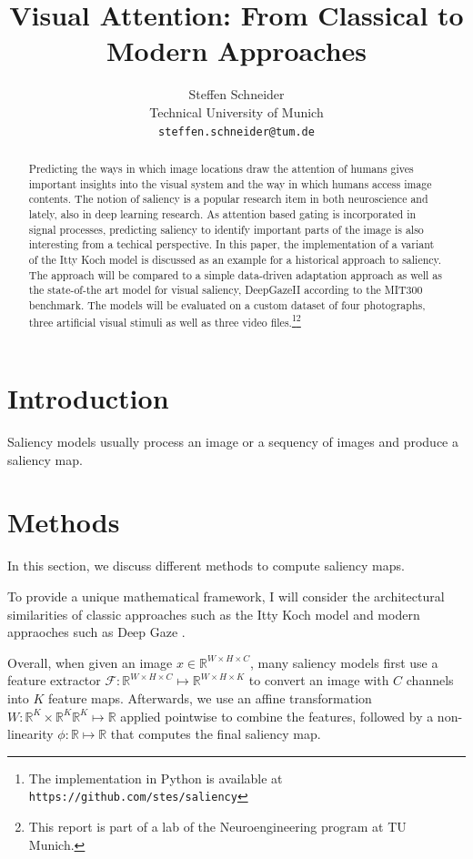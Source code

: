 \documentclass[a4paper,twocolumn,10pt]{article}
\title{Visual Attention: From Classical to Modern Approaches}
\author{Steffen Schneider\\
Technical University of Munich\\
\texttt{steffen.schneider@tum.de}\\
}
\date{}
\newcommand{\R}{\mathds{R}}
\newcommand{\F}{\mathcal{F}}
\begin{document}
\maketitle


\begin{abstract}
  Predicting the ways in which image locations draw the attention of humans gives important insights into the visual system and the way in which humans access image contents.
  The notion of saliency is a popular research item in both neuroscience and lately, also in deep learning research.
  As attention based gating is incorporated in signal processes, predicting saliency to identify important parts of the image is also interesting from a techical perspective.
  In this paper, the implementation of a variant of the Itty Koch model \cite{Itti2000} is discussed as an example for a historical approach to saliency.
  The approach will be compared to a simple data-driven adaptation approach as well as the state-of-the art model for visual saliency, DeepGazeII \cite{Kummerer2017b} according to the MIT300 benchmark.
  The models will be evaluated on a custom dataset of four photographs, three artificial visual stimuli as well as three video files.\footnote{The implementation in Python is available at \texttt{https://github.com/stes/saliency}}\footnote{This report is part of a lab of the Neuroengineering program at TU Munich.}
\end{abstract}

\section{Introduction}

Saliency models usually process an image or a sequency of images and produce a saliency map.

\section{Methods}

In this section, we discuss different methods to compute saliency maps.

To provide a unique mathematical framework, I will consider the architectural similarities of classic approaches such as the Itty Koch model \cite{Itty2000} and modern appraoches such as Deep Gaze \cite{}.

Overall, when given an image $x \in \R^{W\times H \times C}$, many saliency models first use a feature extractor $\F: \R^{W\times H \times C} \mapsto \R^{W\times H \times K}$ to convert an image with $C$ channels into $K$ feature maps.
Afterwards, we use an affine transformation $W : \R^K \times \R^K \R^K \mapsto \R$ applied pointwise to combine the features, followed by a non-linearity $\phi: \R \mapsto \R$ that computes the final saliency map.
\end{document}
